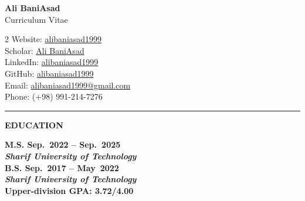 \documentclass[12pt]{article}
\begin{document}
\vspace*{-30pt}
\begin{center}
	{\Large \bfseries Ali BaniAsad} \\
	\vspace{4pt}
	{\large Curriculum Vitae}
\end{center}

\begin{multicols}{2}
    \noindent \href{https://alibaniasad1999.github.io/}{\faGlobe} Website: \href{https://alibaniasad1999.github.io}{alibaniasad1999} \\
    \href{https://scholar.google.com/citations?user=KeKpSvEAAAAJ&hl=en}{\faGraduationCap} Scholar: \href{https://scholar.google.com/citations?user=KeKpSvEAAAAJ&hl=en}{Ali BaniAsad}
    \\
    \href{https://linkedin.com/in/alibaniasad1999/}{{\faLinkedin}}
	LinkedIn: \href{https://linkedin.com/in/alibaniasad1999/}{alibaniasad1999}
    \\
    \href{https://github.com/alibaniasad1999}{\faGithub}
	GitHub: \href{https://github.com/alibaniasad1999}{alibaniasad1999}\\
	\href{mailto:alibaniasad1999@gmail.com}{\faEnvelope} Email: \href{mailto:alibaniasad1999@gmail.com}{alibaniasad1999@gmail.com}   \\
	\faPhone \hspace{0pt}
	Phone: (+98) 991-214-7276
\end{multicols}

	\noindent\rule[0.5ex]{\linewidth}{.5pt}

\begin{center}
	{\noindent \bfseries EDUCATION}
\end{center}

 \vspace{-4pt}

\noindent
 \bf{M.S.}
  \hfill Sep.\ 2022 -- Sep.\ 2025 \\
\noindent \textit{Sharif University of Technology} \\

\noindent
 \bf{B.S.}
 \hfill Sep.\ 2017 -- May\ 2022 \\
\noindent \textit{Sharif University of Technology}\\ Upper-division GPA: 3.72/4.00 \\
\end{document}
